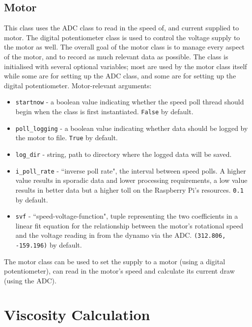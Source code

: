 \documentclass[twoside,a4]{report}
\def\br{\newline \newline \noindent}
\begin{document}
	\subsection*{Motor}
	This class uses the ADC class to read in the speed of, and current supplied to motor. The digital potentiometer class is used to control the voltage supply to the motor as well. The overall goal of the motor class is to manage every aspect of the motor, and to record as much relevant data as possible. 
	\br
	The class is initialised with several optional variables; most are used by the motor class itself while some are for setting up the ADC class, and some are for setting up the digital potentiometer.
	\br
	Motor-relevant arguments:
	\begin{itemize}
		\item \texttt{startnow} - a boolean value indicating whether the speed poll thread should begin when the class is first instantiated. \texttt{False} by default.
		\item \texttt{poll\_logging} - a boolean value indicating whether data should be logged by the motor to file. \texttt{True} by default.
		\item \texttt{log\_dir} - string, path to directory where the logged data will be saved.
		\item \texttt{i\_poll\_rate} - ``inverse poll rate", the interval between speed polls. A higher value results in sporadic data and lower processing requirements, a low value results in better data but a higher toll on the Raspberry Pi's resources. \texttt{0.1} by default.
		\item \texttt{svf} - ``speed-voltage-function", tuple representing the two coefficients in a linear fit equation for the relationship between the motor's rotational speed and the voltage reading in from the dynamo via the ADC. \texttt{(312.806, -159.196)} by default.
	\end{itemize}
	The motor class can be used to set the supply to a motor (using a digital potentiometer), can read in the motor's speed and calculate its current draw (using the ADC).
	
	
	\section{Viscosity Calculation}
\end{document}
